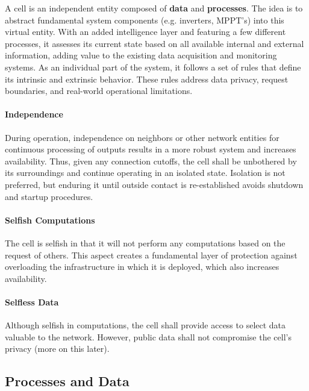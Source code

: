A cell is an independent entity composed of \textbf{data} and \textbf{processes}. The idea is to abstract fundamental system components (e.g. inverters, MPPT's) into this virtual entity. With an added intelligence layer and featuring a few different processes, it assesses its current state based on all available internal and external information, adding value to the existing data acquisition and monitoring systems. As an individual part of the system, it follows a set of rules that define its intrinsic and extrinsic behavior. These rules address data privacy, request boundaries, and real-world operational limitations.

\paragraph*{Independence} During operation, independence on neighbors or other network entities for continuous processing of outputs results in a more robust system and increases availability. Thus, given any connection cutoffs, the cell shall be unbothered by its surroundings and continue operating in an isolated state. Isolation is not preferred, but enduring it until outside contact is re-established avoids shutdown and startup procedures.

\paragraph*{Selfish Computations} The cell is selfish in that it will not perform any computations based on the request of others. This aspect creates a fundamental layer of protection against overloading the infrastructure in which it is deployed, which also increases availability.

\paragraph*{Selfless Data} Although selfish in computations, the cell shall provide access to select data valuable to the network. However, public data shall not compromise the cell's privacy (more on this later).

\subsection{Processes and Data}

